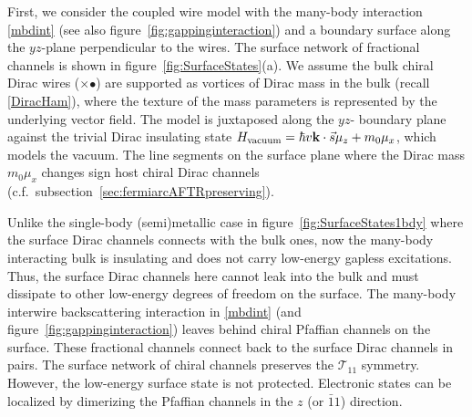 First, we consider the coupled wire model with the many-body interaction \eqref{mbdint} (see also figure~\ref{fig:gappinginteraction}) and a boundary surface along the $yz$-plane perpendicular to the wires. The surface network of fractional channels is shown in figure~\ref{fig:SurfaceStates}(a). We assume the bulk chiral Dirac wires ({\color{blue}$\times$}{\color{red}$\bullet$}) are supported as vortices of Dirac mass in the bulk (recall \eqref{DiracHam}), where the texture of the mass parameters is represented by the underlying vector field. The model is juxtaposed along the $yz$- boundary plane against the trivial Dirac insulating state $H_{\mathrm{vacuum}}=\hbar v{\bf k}\cdot\vec{s}\mu_z+m_0\mu_x$, which models the vacuum. The line segments on the surface plane where the Dirac mass $m_0\mu_x$ changes sign host chiral Dirac channels (c.f.~subsection~\ref{sec:fermiarcAFTRpreserving}).

Unlike the single-body (semi)metallic case in figure~\ref{fig:SurfaceStates1bdy} where the surface Dirac channels connects with the bulk ones, now the many-body interacting bulk is insulating and does not carry low-energy gapless excitations. Thus, the surface Dirac channels here cannot leak into the bulk and must dissipate to other low-energy degrees of freedom on the surface. The many-body interwire backscattering interaction in \eqref{mbdint} (and figure~\ref{fig:gappinginteraction}) leaves behind chiral Pfaffian channels on the surface. These fractional channels connect back to the surface Dirac channels in pairs. The surface network of chiral channels preserves the \AFTR $\mathcal{T}_{11}$ symmetry. However, the low-energy surface state is not protected. Electronic states can be localized by dimerizing the Pfaffian channels in the $z$ (or $\bar{1}1$) direction.

